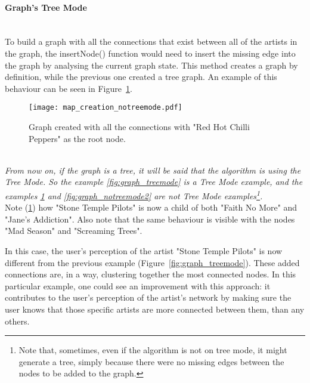       \paragraph{Graph's Tree Mode} \hfill \\
      To build a graph with all the connections that exist between all of the artists in the graph, the insertNode() function would need to insert the missing edge into the graph by analysing the current graph state.
      This method creates a graph by definition, while the previous one created a tree graph.
      An example of this behaviour can be seen in Figure~\ref{fig:graph_notreemode}.
      \begin{figure}[tb]
        \begin{center}
          \texttt{[image: map\_creation\_notreemode.pdf]}
        \end{center}
        \caption{Graph created with all the connections with "Red Hot Chilli Peppers" as the root node.}
        \label{fig:graph_notreemode}
      \end{figure}

      \hfill \\
      \indent \emph{
      From now on, if the graph is a tree, it will be said that the algorithm is using the \emph{Tree Mode}.
      So the example \ref{fig:graph_treemode} is a \emph{Tree Mode} example, and the examples \ref{fig:graph_notreemode} and \ref{fig:graph_notreemode2} are not \emph{Tree Mode} examples\footnote{
        Note that, sometimes, even if the algorithm is not on tree mode, it might generate a tree, simply because there were no missing edges between the nodes to be added to the graph.
      }.}
      \hfill \\

      Note (\ref{fig:graph_notreemode}) how "Stone Temple Pilots" is now a child of both "Faith No More" and "Jane's Addiction".
      Also note that the same behaviour is visible with the nodes "Mad Season" and "Screaming Trees".

      In this case, the user's perception of the artist "Stone Temple Pilots" is now different from the previous example (Figure~\ref{fig:graph_treemode}).
      These added connections are, in a way, clustering together the most connected nodes.
      In this particular example, one could see an improvement with this approach: it contributes to the user's perception of the artist's network by making sure the user knows that those specific artists are more connected between them, than any others.

